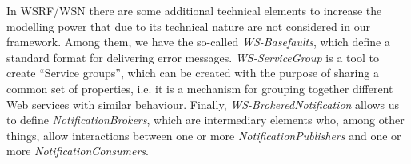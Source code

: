 \begin{itemize}


\end{itemize}

In WSRF/WSN there are some additional technical elements to 
increase the modelling
power that due to its technical nature
are not considered in our framework. Among them, we
have the so-called {\em WS-Basefaults}, which 
define a standard format for delivering error messages. 
{\em WS-ServiceGroup} is a tool to create ``Service groups'',
which can be created
with the purpose of sharing a common set of properties, i.e. it is 
a mechanism 
for grouping together different Web services with similar behaviour.
Finally, {\em WS-BrokeredNotification} allows us to define
\emph{NotificationBrokers}, which are intermediary elements who, 
among other things, allow interactions between one or more 
\emph{NotificationPublishers} and one or more 
\emph{NotificationConsumers}. 



